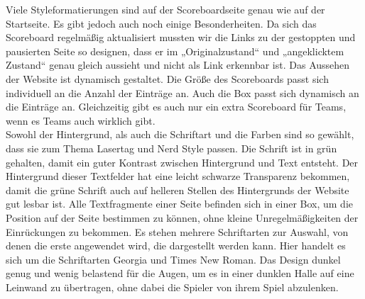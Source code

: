 Viele Styleformatierungen sind auf der Scoreboardseite genau wie auf der Startseite. Es gibt jedoch auch noch einige Besonderheiten. Da sich das Scoreboard regelmäßig aktualisiert mussten wir die Links zu der gestoppten und pausierten Seite so designen, dass er im „Originalzustand“ und „angeklicktem Zustand“ genau gleich aussieht und nicht als Link erkennbar ist.
Das Aussehen der Website ist  dynamisch gestaltet. Die Größe des Scoreboards passt sich individuell an die Anzahl der Einträge an. Auch die Box passt sich dynamisch an die Einträge an. Gleichzeitig gibt es auch nur ein extra Scoreboard für Teams, wenn es Teams auch wirklich gibt.\\ Sowohl der Hintergrund, als auch die Schriftart und die Farben sind so gewählt, dass sie zum Thema Lasertag und Nerd Style passen. 
Die Schrift ist in grün gehalten, damit ein guter Kontrast zwischen Hintergrund und Text entsteht. Der Hintergrund dieser Textfelder hat eine leicht schwarze Transparenz bekommen, damit die grüne Schrift auch auf helleren Stellen des Hintergrunds der Website gut lesbar ist. Alle Textfragmente einer Seite befinden sich in einer Box, um die Position auf der Seite bestimmen zu können, ohne kleine Unregelmäßigkeiten der Einrückungen zu bekommen. Es stehen mehrere Schriftarten zur Auswahl, von denen die erste angewendet wird, die dargestellt werden kann. Hier handelt es sich um die Schriftarten Georgia und Times New Roman. Das Design dunkel genug und wenig belastend für die Augen, um es in einer dunklen Halle auf eine Leinwand zu übertragen, ohne dabei die Spieler von ihrem Spiel abzulenken. \\\\


